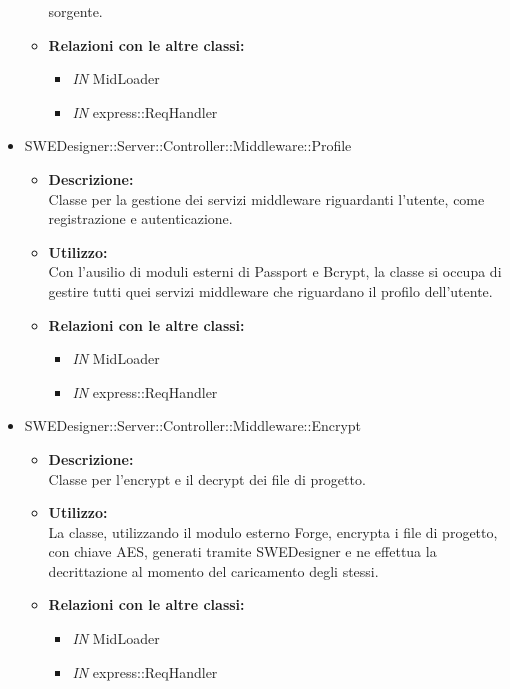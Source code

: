 \begin{itemize}
\begin{itemize}
				sorgente.
				\item \textbf{Relazioni con le altre classi: }
				\begin{itemize}
					\item \emph{IN} MidLoader
					\item \emph{IN} express::ReqHandler
				\end{itemize}
			\end{itemize}
			\item SWEDesigner::Server::Controller::Middleware::Profile
			\begin{itemize}
				\item \textbf{Descrizione: }\\
				Classe per la gestione dei servizi middleware riguardanti l'utente, come registrazione e autenticazione.
				\item \textbf{Utilizzo: }\\
				Con l'ausilio di moduli esterni di Passport	e Bcrypt, la classe si occupa di gestire tutti quei servizi middleware che riguardano il profilo dell'utente.
				\item \textbf{Relazioni con le altre classi: }
				\begin{itemize}
					\item \emph{IN} MidLoader
					\item \emph{IN} express::ReqHandler
				\end{itemize}
			\end{itemize}
			\item SWEDesigner::Server::Controller::Middleware::Encrypt
			\begin{itemize}
				\item \textbf{Descrizione: }\\
				Classe per l'encrypt e il decrypt dei file di progetto.
				\item \textbf{Utilizzo: }\\
				La classe, utilizzando il modulo esterno Forge, encrypta i file di progetto, con chiave AES, generati tramite SWEDesigner e ne effettua la decrittazione al momento del caricamento
				degli stessi.
				\item \textbf{Relazioni con le altre classi: }
				\begin{itemize}
					\item \emph{IN} MidLoader
					\item \emph{IN} express::ReqHandler
				\end{itemize}
			\end{itemize}
		\end{itemize}


